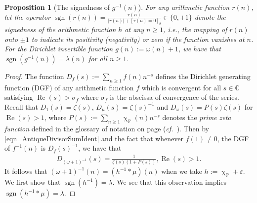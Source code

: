 \documentclass[11pt,reqno,a4letter]{article}
\numberwithin{figure}{section}
\numberwithin{table}{section}
\newcommand{\cf}{\textit{cf.\ }}
\newcommand{\Iverson}[1]{\ensuremath{\left[#1\right]_{\delta}}}
\renewcommand{\chi}{\upchi}
\theoremstyle{plain}
\newtheorem{prop}[theorem]{Proposition}
\numberwithin{theorem}{section}
\theoremstyle{definition}
\renewcommand{\Re}{\operatorname{Re}}
\begin{document}
\begin{prop}[The signedness of $g^{-1}(n)$]
\label{prop_SignageDirInvsOfPosBddArithmeticFuncs_v1} 
For any arithmetic function $r(n)$, let the operator 
$\operatorname{sgn}(r(n)) = \frac{r(n)}{|r(n)| + \Iverson{r(n) = 0}} \in \{0, \pm 1\}$ 
denote the signedness of the arithmetic function $h$ at any $n \geq 1$, i.e., the mapping of 
$r(n)$ onto $\pm 1$ to indicate its positivity (negativity) or zero if the function vanishes at $n$. 
For the Dirichlet invertible function $g(n) := \omega(n) + 1$, 
we have that $\operatorname{sgn}(g^{-1}(n)) = \lambda(n)$ for all $n \geq 1$. 
\end{prop} 
\begin{proof} 
The function $D_f(s) := \sum_{n \geq 1} f(n) n^{-s}$ defines the 
Dirichlet generating function (DGF) of any 
arithmetic function $f$ which is convergent for all $s \in \mathbb{C}$ satisfying 
$\Re(s) > \sigma_f$ where $\sigma_f$ is the abscissa of convergence of the series. 
Recall that $D_1(s) = \zeta(s)$, $D_{\mu}(s) = \zeta(s)^{-1}$ and 
$D_{\omega}(s) = P(s) \zeta(s)$ for $\Re(s) > 1$, where $P(s) := \sum_{n \geq 1} \chi_{\mathbb{P}}(n) n^{-s}$ 
denotes the \emph{prime zeta function} defined in the glossary of notation on 
page \pageref{Section_NotationAndConventions} (\cf \cite{FROBERG-1968}). 
Then by \eqref{eqn_AntiqueDivisorSumIdent} and the fact that whenever $f(1) \neq 0$, 
the DGF of $f^{-1}(n)$ is $D_f(s)^{-1}$, we have that 
\begin{align} 
\label{eqn_DGF_of_gInvn} 
D_{(\omega+1)^{-1}}(s) = \frac{1}{\zeta(s) (1+P(s))}, \Re(s) > 1. 
\end{align} 
It follows that $(\omega + 1)^{-1}(n) = (h^{-1} \ast \mu)(n)$ when we take 
$h := \chi_{\mathbb{P}} + \varepsilon$. 
We first show that $\operatorname{sgn}(h^{-1}) = \lambda$. 
We see that this observation implies 
$\operatorname{sgn}(h^{-1} \ast \mu) = \lambda$. 


\end{proof}
\end{document}
